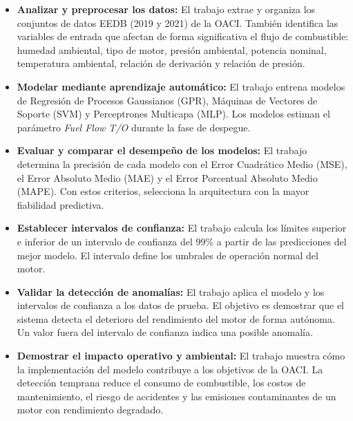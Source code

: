 \begin{itemize}
    \item \textbf{Analizar y preprocesar los datos:} El trabajo extrae y organiza los conjuntos de datos EEDB (2019 y 2021) de la OACI. También identifica las variables de entrada que afectan de forma significativa el flujo de combustible: humedad ambiental, tipo de motor, presión ambiental, potencia nominal, temperatura ambiental, relación de derivación y relación de presión.

    \item \textbf{Modelar mediante aprendizaje automático:} El trabajo entrena modelos de Regresión de Procesos Gaussianos (GPR), Máquinas de Vectores de Soporte (SVM) y Perceptrones Multicapa (MLP). Los modelos estiman el parámetro \textit{Fuel Flow T/O} durante la fase de despegue.

    \item \textbf{Evaluar y comparar el desempeño de los modelos:} El trabajo determina la precisión de cada modelo con el Error Cuadrático Medio (MSE), el Error Absoluto Medio (MAE) y el Error Porcentual Absoluto Medio (MAPE). Con estos criterios, selecciona la arquitectura con la mayor fiabilidad predictiva.

    \item \textbf{Establecer intervalos de confianza:} El trabajo calcula los límites superior e inferior de un intervalo de confianza del 99\% a partir de las predicciones del mejor modelo. El intervalo define los umbrales de operación normal del motor.

    \item \textbf{Validar la detección de anomalías:} El trabajo aplica el modelo y los intervalos de confianza a los datos de prueba. El objetivo es demostrar que el sistema detecta el deterioro del rendimiento del motor de forma autónoma. Un valor fuera del intervalo de confianza indica una posible anomalía.

    \item \textbf{Demostrar el impacto operativo y ambiental:} El trabajo muestra cómo la implementación del modelo contribuye a los objetivos de la OACI. La detección temprana reduce el consumo de combustible, los costos de mantenimiento, el riesgo de accidentes y las emisiones contaminantes de un motor con rendimiento degradado.
\end{itemize}
